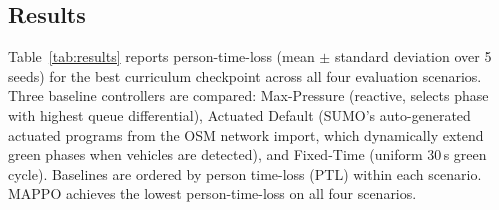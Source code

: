 \documentclass{article}
\begin{document}
\subsection{Results}
\label{sec:results}

Table~\ref{tab:results} reports person-time-loss (mean $\pm$ standard deviation over 5 seeds) for the best curriculum checkpoint across all four evaluation scenarios. Three baseline controllers are compared: Max-Pressure (reactive, selects phase with highest queue differential), Actuated Default (SUMO's auto-generated actuated programs from the OSM network import, which dynamically extend green phases when vehicles are detected), and Fixed-Time (uniform 30\,s green cycle). Baselines are ordered by person time-loss (PTL) within each scenario. MAPPO achieves the lowest person-time-loss on all four scenarios.
\end{document}
